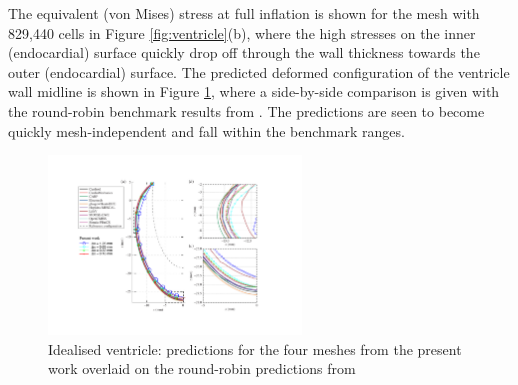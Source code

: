 \documentclass[sn-mathphys,Numbered]{sn-jnl}%
\begin{document}
The equivalent (von Mises) stress at full inflation is shown for the mesh with 829,440 cells in Figure \ref{fig:ventricle}(b), where the high stresses on the inner (endocardial) surface quickly drop off through the wall thickness towards the outer (endocardial) surface.
The predicted deformed configuration of the ventricle wall midline is shown in Figure \ref{fig:ventricle_accuracy}, where a side-by-side comparison is given with the round-robin benchmark results from \citet{Land2015}.
The predictions are seen to become quickly mesh-independent and fall within the benchmark ranges.
\begin{figure}[htbp]
	\centering
   		\includegraphics[width=0.6\textwidth]{figures/ventricle_results} 
	\caption{Idealised ventricle: predictions for the four meshes from the present work overlaid on the round-robin predictions from \citet{Land2015}}
	\label{fig:ventricle_accuracy}
\end{figure}
\end{document}
